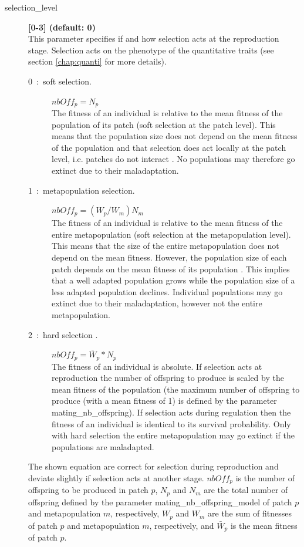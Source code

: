 \documentclass[letterpaper,12pt,oneside]{book}
\begin{document}
\begin{description}
\item[selection\_level] \textbf{[0-3] (default: 0)}\\
This parameter specifies if and how selection acts at the reproduction stage. Selection acts on the phenotype of the quantitative traits (see section \ref{chap:quanti} for more details).
\begin{description}
\item [0~:~soft selection.] $nbOff_{p} = N_{p}$\\
The fitness of an individual is relative to the mean fitness of the population of its patch (soft selection at the patch level). This means that the population size does not depend on the mean fitness of the population and that selection does act locally at the patch level, i.e. patches do not interact \citep{Wallace_1975}. No populations may therefore go extinct due to their maladaptation.

\item [1~:~metapopulation selection.] $nbOff_{p} = (W_{p}/W_{m})N_{m}$\\
The fitness of an individual is relative to the mean fitness of the entire metapopulation (soft selection at the metapopulation level). This means that the size of the entire metapopulation does not depend on the mean fitness. However, the population size of each patch depends on the mean fitness of its population \citep{Ravigne_2004}. This implies that a well adapted population grows while the population size of a less adapted population declines. Individual populations may go extinct due to their maladaptation, however not the entire metapopulation. 

\item [2~:~hard selection .] $nbOff_{p} = \bar{W}_{p}*N_{p}$\\
The fitness of an individual is absolute. If selection acts at reproduction the number of offspring to produce is scaled by the mean fitness of the population (the maximum number of offspring to produce (with a mean fitness of 1) is defined by the parameter \textsf{mating\_nb\_offspring}). If selection acts during regulation then the fitness of an individual is identical to its survival probability. Only with hard selection the entire metapopulation may go extinct if the populations are maladapted. 


\end{description}

The shown equation are correct for selection during reproduction and deviate slightly if selection acts at another stage. $nbOff_{p}$ is the number of offspring to be produced in patch $p$, $N_{p}$ and $N_{m}$ are the total number of offspring defined by the parameter \textsf{mating\_nb\_offspring\_model} of patch $p$ and metapopulation $m$, respectively, $W_{p}$ and $W_{m}$ are the sum of fitnesses of patch $p$ and metapopulation $m$, respectively, and $\bar{W}_{p}$ is the mean fitness of patch $p$. 



\end{description}
\end{document}
